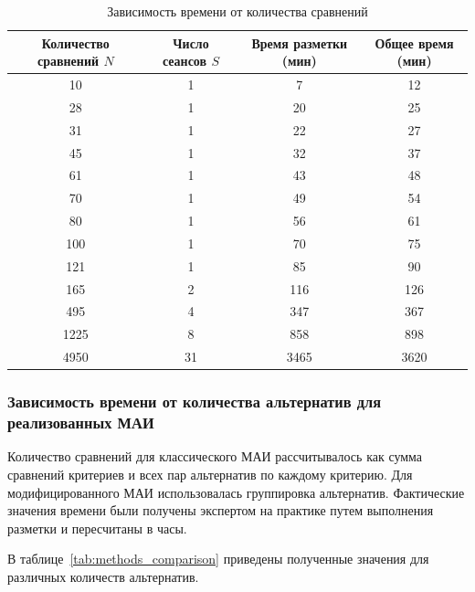 \begin{landscape}
\vspace*{\fill}
\begin{table}[H]
\centering
\caption{Зависимость времени от количества сравнений}
\label{tab:time_by_comparisons}
\begin{tabular}{|c|c|c|c|}
\hline
\textbf{Количество сравнений \(N\)} & \textbf{Число сеансов \(S\)} & \textbf{Время разметки (мин)} & \textbf{Общее время (мин)} \\
\hline
10 & 1 & 7 & 12 \\
\hline
28 & 1 & 20 & 25 \\
\hline
31 & 1 & 22 & 27 \\
\hline
45 & 1 & 32 & 37 \\
\hline
61 & 1 & 43 & 48 \\
\hline
70 & 1 & 49 & 54 \\
\hline
80 & 1 & 56 & 61 \\
\hline
100 & 1 & 70 & 75 \\
\hline
121 & 1 & 85 & 90 \\
\hline
165 & 2 & 116 & 126 \\
\hline
495 & 4 & 347 & 367 \\
\hline
1225 & 8 & 858 & 898 \\
\hline
4950 & 31 & 3465 & 3620 \\
\hline
\end{tabular}
\end{table}
\vspace*{\fill}
\end{landscape}

\subsubsection{Зависимость времени от количества альтернатив для реализованных МАИ}

Количество сравнений для классического МАИ рассчитывалось как сумма сравнений критериев и всех пар альтернатив по каждому критерию. 
Для модифицированного МАИ использовалась группировка альтернатив. 
Фактические значения времени были получены экспертом на практике путем выполнения разметки и пересчитаны в часы.

В таблице~\ref{tab:methods_comparison} приведены полученные значения для различных количеств альтернатив.


